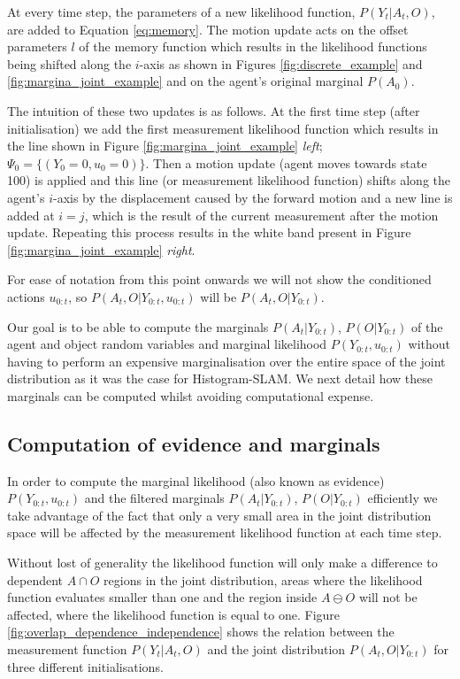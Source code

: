 At every time step, the parameters of a new likelihood function, $P(Y_t|A_t,O)$, are added to Equation \ref{eq:memory}.
The motion update acts on the offset parameters $l$ of the memory function which results in the likelihood functions being shifted
along the $i$-axis as shown in Figures \ref{fig:discrete_example} and \ref{fig:margina_joint_example} and on the agent's original marginal $P(A_0)$.

The intuition of these two updates is as follows. At the first time step (after initialisation) we add the first measurement 
likelihood function which results in the line shown in Figure \ref{fig:margina_joint_example} \textit{left}; $\Psi_0 = \{(Y_0=0,u_0=0)\}$. 
Then a motion update (agent moves towards state 100) is applied and this line (or measurement
likelihood function) shifts along the agent's $i$-axis by the displacement caused by the forward motion and a new line is added at $i=j$, 
which is the result of the current measurement after the motion update. Repeating this process results in the white band present 
in Figure \ref{fig:margina_joint_example} \textit{right}. 

For ease of notation from this point onwards we will not show the conditioned actions $u_{0:t}$, so $P(A_t,O|Y_{0:t},u_{0:t})$ will 
be $P(A_t,O|Y_{0:t})$.

Our goal is to be able to compute the marginals $P(A_t|Y_{0:t})$, $P(O|Y_{0:t})$ of the agent and object random variables and 
marginal likelihood $P(Y_{0:t},u_{0:t})$ without having to perform an expensive marginalisation over the entire space of the joint distribution as it was the case for Histogram-SLAM.
We next detail how these marginals can be computed whilst avoiding computational expense.

\subsection{Computation of evidence and marginals}

In order to compute the marginal likelihood (also known as evidence) $P(Y_{0:t},u_{0:t})$ and the filtered  marginals $P(A_t|Y_{0:t})$,
$P(O|Y_{0:t})$ efficiently we take advantage of the fact that only a very small area 
in the joint distribution space will be affected by the measurement likelihood function at each time step.

Without lost of generality the likelihood function will only make a difference to dependent $A \cap O$ regions in the joint distribution, areas 
where the likelihood function evaluates smaller than one and the region inside $A \ominus O$ will not be affected, where the likelihood function 
is equal to one.
Figure \ref{fig:overlap_dependence_independence} shows the relation between the measurement 
function $P(Y_t|A_t,O)$ and the joint distribution $P(A_t,O|Y_{0:t})$ for three different initialisations. 

